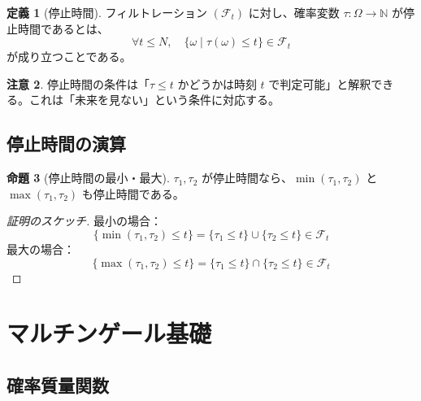 \documentclass[a4paper,12pt]{ltjsarticle}
\theoremstyle{definition}
\newtheorem{definition}{定義}[section]
\newtheorem{proposition}[definition]{命題}
\newtheorem{remark}[definition]{注意}
\begin{document}
\begin{definition}[停止時間]
フィルトレーション $(\mathcal{F}_t)$ に対し、確率変数 $\tau : \Omega \to \mathbb{N}$ が停止時間であるとは、
\[
\forall t \leq N, \quad \{\omega \mid \tau(\omega) \leq t\} \in \mathcal{F}_t
\]
が成り立つことである。
\end{definition}

\begin{remark}
停止時間の条件は「$\tau \leq t$ かどうかは時刻 $t$ で判定可能」と解釈できる。これは「未来を見ない」という条件に対応する。
\end{remark}

\subsection{停止時間の演算}

\begin{proposition}[停止時間の最小・最大]
$\tau_1, \tau_2$ が停止時間なら、$\min(\tau_1, \tau_2)$ と $\max(\tau_1, \tau_2)$ も停止時間である。
\end{proposition}

\begin{proof}[証明のスケッチ]
最小の場合：
\[
\{\min(\tau_1, \tau_2) \leq t\} = \{\tau_1 \leq t\} \cup \{\tau_2 \leq t\} \in \mathcal{F}_t
\]
最大の場合：
\[
\{\max(\tau_1, \tau_2) \leq t\} = \{\tau_1 \leq t\} \cap \{\tau_2 \leq t\} \in \mathcal{F}_t
\]
\end{proof}

\begin{center}
\end{center}

\section{マルチンゲール基礎}

\subsection{確率質量関数}
\end{document}
